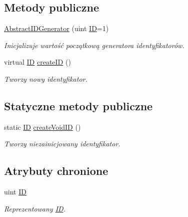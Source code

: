 \subsection*{Metody publiczne}
\begin{DoxyCompactItemize}
\item 
\hyperlink{classobsolete_1_1AbstractIDGenerator_a99b8f2659b2f0120f5601789ea89edc1}{AbstractIDGenerator} (uint \hyperlink{classobsolete_1_1ID}{ID}=1)
\begin{DoxyCompactList}\small\item\em Inicjalizuje wartość początkową generatora identyfikatorów. \item\end{DoxyCompactList}\item 
virtual \hyperlink{classobsolete_1_1ID}{ID} \hyperlink{classobsolete_1_1AbstractIDGenerator_a39d2f0147e3a028fef8299770e23db90}{createID} ()
\begin{DoxyCompactList}\small\item\em Tworzy nowy identyfikator. \item\end{DoxyCompactList}\end{DoxyCompactItemize}
\subsection*{Statyczne metody publiczne}
\begin{DoxyCompactItemize}
\item 
static \hyperlink{classobsolete_1_1ID}{ID} \hyperlink{classobsolete_1_1AbstractIDGenerator_a330da88ba80820ca6ce0a29cbbab9e1b}{createVoidID} ()
\begin{DoxyCompactList}\small\item\em Tworzy niezainicjowany identyfikator. \item\end{DoxyCompactList}\end{DoxyCompactItemize}
\subsection*{Atrybuty chronione}
\begin{DoxyCompactItemize}
\item 
uint \hyperlink{classobsolete_1_1AbstractID_a5f67fa1c7d96085f0ef41193b60b570c}{ID}
\begin{DoxyCompactList}\small\item\em Reprezentowany \hyperlink{classobsolete_1_1ID}{ID}. \item\end{DoxyCompactList}\end{DoxyCompactItemize}


